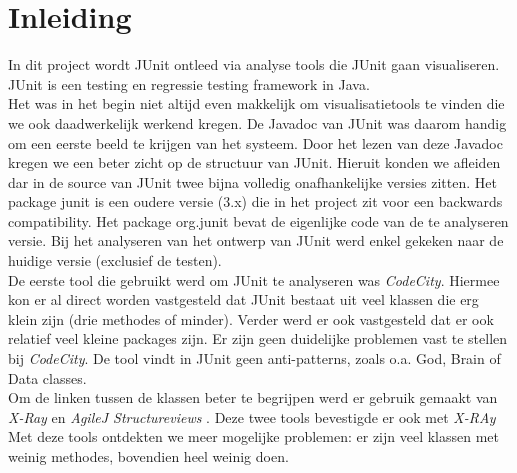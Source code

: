 \documentclass[i1]{oss}
\begin{document}

\maketitlepage
\newpage
\tableofcontents
\pagebreak

\section*{Inleiding}


In dit project wordt JUnit ontleed via analyse tools die JUnit gaan visualiseren. JUnit is een testing en regressie testing framework in Java.\\


Het was in het begin niet altijd even makkelijk om visualisatietools te vinden die we ook daadwerkelijk werkend kregen. De Javadoc van JUnit was daarom handig om een eerste beeld te krijgen van het systeem. Door het lezen van deze Javadoc kregen we een beter zicht op de structuur van JUnit. Hieruit konden we afleiden dar in de source van JUnit twee bijna volledig onafhankelijke versies zitten. Het package junit is een oudere versie (3.x) die in het project zit voor een backwards compatibility. Het package org.junit bevat de eigenlijke code van de te analyseren versie. Bij het analyseren van het ontwerp van JUnit werd enkel gekeken naar de huidige versie (exclusief de testen).\\

De eerste tool die gebruikt werd om JUnit te analyseren was \emph{CodeCity}. Hiermee kon er al direct worden vastgesteld dat JUnit bestaat uit veel klassen die erg klein zijn (drie methodes of minder). Verder werd er ook vastgesteld dat er ook relatief veel kleine packages zijn. Er zijn geen duidelijke problemen vast te stellen bij \emph{CodeCity}. De tool vindt in JUnit geen anti-patterns, zoals o.a. God, Brain of Data classes. \\

Om de linken tussen de klassen beter te begrijpen werd er gebruik gemaakt van \emph{X-Ray} \cite{X-Ray} en \emph{AgileJ Structureviews} \cite{AgileJ Structureviews}. Deze twee tools bevestigde er ook met \emph{X-RAy} Met deze tools ontdekten we meer mogelijke problemen: er zijn veel klassen met weinig methodes,  bovendien heel weinig doen.\\
\end{document}
